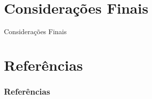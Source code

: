 \documentclass[aspectratio=169, xcolor={dvipsnames}, 10pt, brazil]{beamer}
\begin{document}
\section{Considerações Finais}
\begin{frame}{Considerações Finais}
    \lipsum[7]
\end{frame}


\section{Referências}
\begin{frame}[t, allowframebreaks]

    \frametitle{Referências}
    
    
\end{frame}
\end{document}
